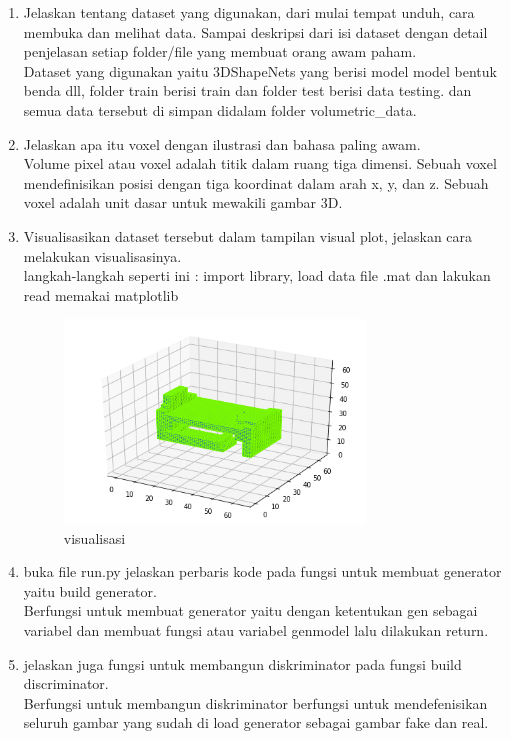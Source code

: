 \begin{enumerate}
\item Jelaskan tentang dataset yang digunakan, dari mulai tempat unduh, cara membuka dan melihat data. Sampai deskripsi dari isi dataset dengan detail penjelasan setiap folder/ﬁle yang membuat orang awam paham.
	\hfill\\
	Dataset yang digunakan yaitu 3DShapeNets yang berisi model model bentuk benda dll, folder train berisi train dan folder test berisi data testing. dan semua data tersebut di simpan didalam folder volumetric\_data.

\item Jelaskan apa itu voxel dengan ilustrasi dan bahasa paling awam.
	\hfill\\
	Volume pixel atau voxel adalah titik dalam ruang tiga dimensi. Sebuah voxel mendefinisikan posisi dengan tiga koordinat dalam arah x, y, dan z. Sebuah voxel adalah unit dasar untuk mewakili gambar 3D.

\item Visualisasikan dataset tersebut dalam tampilan visual plot, jelaskan cara melakukan visualisasinya.
	\hfill\\
	
	langkah-langkah seperti ini :
	import library, load data file .mat dan lakukan read memakai matplotlib
\begin{figure}[H]
    \includegraphics[width=8cm]{figures/1174084/8/bed.png}
    \centering
    \caption{visualisasi}
\end{figure}		
	

\item buka ﬁle run.py jelaskan perbaris kode pada fungsi untuk membuat generator yaitu build generator.
	\hfill\\
		
	Berfungsi untuk membuat generator yaitu dengan ketentukan gen sebagai variabel dan membuat fungsi atau variabel genmodel lalu dilakukan return.

\item jelaskan juga fungsi untuk membangun diskriminator pada fungsi build discriminator.
	\hfill\\
		
	Berfungsi untuk membangun diskriminator berfungsi untuk mendefenisikan seluruh gambar yang sudah di load generator sebagai gambar fake dan real.


\end{enumerate}
